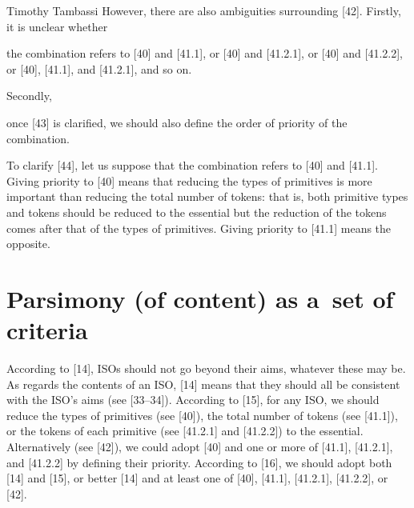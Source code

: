 \begin{artengenv}{Timothy Tambassi}
However, there are also ambiguities surrounding [42]. Firstly, it is unclear whether




\begin{enumerate}[label={[\arabic*]}]

\setcounter{enumi}{\value{saveenumtambassi}}

\item the combination refers to [40] and [41.1], or [40] and [41.2.1], or [40] and [41.2.2], or [40], [41.1], and [41.2.1], and so on.

\end{enumerate}

Secondly,



\setcounter{saveenumtambassi}{\value{enumi}}

\begin{enumerate}[label={[\arabic*]}]

\setcounter{enumi}{\value{saveenumtambassi}}

\item once [43] is clarified, we should also define the order of priority of the combination.

\end{enumerate}

To clarify [44], let us suppose that the combination refers to [40] and [41.1]. Giving priority to [40] means that reducing the types of primitives is more important than reducing the total number of tokens: that is, both primitive types and tokens should be reduced to the essential but the reduction of the tokens comes after that of the types of primitives. Giving priority to [41.1] means the opposite.



\section{Parsimony (of content) as a~set of criteria}

According to [14], ISOs should not go beyond their aims, whatever these may be. As regards the contents of an ISO, [14] means that they should all be consistent with the ISO's aims (see [33–34]). According to [15], for any ISO, we should reduce the types of primitives (see [40]), the total number of tokens (see [41.1]), or the tokens of each primitive (see [41.2.1] and [41.2.2]) to the essential. Alternatively (see [42]), we could adopt [40] and one or more of [41.1], [41.2.1], and [41.2.2] by defining their priority. According to [16], we should adopt both [14] and [15], or better [14] and at least one of [40], [41.1], [41.2.1], [41.2.2], or [42].




\end{artengenv}
